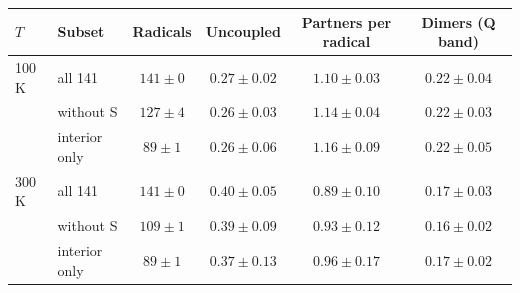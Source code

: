\begin{tabular}{llcccc}
\toprule
$T$ & Subset & Radicals & Uncoupled & Partners per radical & Dimers (Q band)\\
\midrule
100 K & all 141 & $141\pm0$ & $0.27\pm0.02$ & $1.10\pm0.03$ & $0.22\pm0.04$\\
 & without S & $127\pm4$ & $0.26\pm0.03$ & $1.14\pm0.04$ & $0.22\pm0.03$\\
 & interior only & $89\pm1$ & $0.26\pm0.06$ & $1.16\pm0.09$ & $0.22\pm0.05$\\
300 K & all 141 & $141\pm0$ & $0.40\pm0.05$ & $0.89\pm0.10$ & $0.17\pm0.03$\\
 & without S & $109\pm1$ & $0.39\pm0.09$ & $0.93\pm0.12$ & $0.16\pm0.02$\\
 & interior only & $89\pm1$ & $0.37\pm0.13$ & $0.96\pm0.17$ & $0.17\pm0.02$\\
\bottomrule
\end{tabular}
